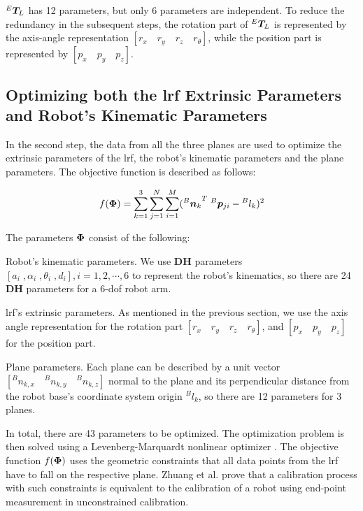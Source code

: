 ${^E}\vb*{T}_L$ has 12 parameters, but only 6 parameters are independent. To reduce the redundancy in the subsequent steps, the rotation part of ${^E}\vb*{T}_L$ is represented by the axis-angle representation $[r_x \quad r_y \quad r_z \quad r_{\theta}]$, while the position part is represented by  $[p_x \quad p_y\quad p_z]$.


\subsection{Optimizing both the \ac{lrf} Extrinsic Parameters and Robot's Kinematic Parameters}
\label{sec:second_step}
In the second step, the data from all the three planes are used to optimize the extrinsic parameters of the \ac{lrf}, the robot's kinematic parameters and the plane parameters. The objective function is described as follows:

\begin{equation}
 f (\vb*{\Phi}) =  \sum_{k=1}^{3} \sum_{j=1}^{N} \sum_{i=1}^{M} ({{^B}\vb*{n}_k}^T \; {^B}\vb*{p}_{ji} - {^B}l_k)^2
\end{equation}

The parameters $\vb*{\Phi}$ consist of the following:
\begin{compactenum}
\item Robot's kinematic parameters. We use  \textbf{DH} parameters \cite{Craig1986} $[a_i \;, \alpha_i \;,\theta_i \;,d_i], i=1, 2, \cdots ,6$ to represent the robot's kinematics, so there are 24 \textbf{DH} parameters for a 6-\ac{dof} robot arm. 
\item \ac{lrf}'s extrinsic parameters. As mentioned in the previous section, we use the axis angle representation for the rotation part $[r_x \quad r_y \quad r_z \quad r_{\theta}]$, and $[p_x \quad p_y\quad p_z]$ for the position part. 
\item Plane parameters. Each plane can be described by a unit vector $[{^B}n_{k,x}\quad {^B}n_{k,y}\quad {^B}n_{k,z}]$ normal to the plane and its perpendicular distance from the robot base's coordinate system origin ${^B}l_{k}$, so there are 12 parameters for 3 planes.
\end{compactenum}

In total, there are 43 parameters to be optimized. The optimization problem is then solved using a Levenberg-Marquardt nonlinear optimizer \cite{Newville2014}. The objective function $f(\vb*{\Phi})$ uses the geometric constraints that all data points from the \ac{lrf} have to fall on the respective plane. Zhuang et al. \cite{Zhuang1999} prove that a calibration process with such constraints is equivalent to the calibration of a robot using end-point measurement in unconstrained calibration. 


